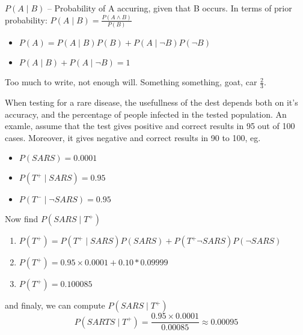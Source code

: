         {
            $P(A\mid B)$ -- Probability of A accuring, given that B occurs. In terms of prior probability:
            $P(A\mid B) = \frac{P(A \wedge B)}{P(B)}$
        }

        {
            \begin{itemize}
                    \item $P(A) = P(A\mid B)P(B) + P(A \mid \neg B)P( \neg B)$
                    \item $P(A \mid B) + P(A \mid \neg B) = 1$
                    
            \end{itemize}
        }

        {
            Too much to write, not enough will. Something something, goat, car $ \frac{2}{3} $.
        }

        {
            When testing for a rare disease, the usefullness of the dest depends both on it's accuracy, and the percentage of people infected in the tested population. An examle, assume that the test gives positive and correct results in 95 out of 100 cases. Moreover, it gives negative and correct results in 90 to 100, eg.
            \begin{itemize}
                    \item $P(SARS) = 0.0001$
                    \item $P( T^{+} \mid SARS) = 0.95$
                    \item $P(T ^{-} \mid \neg SARS) = 0.95$
            \end{itemize}
            Now find $P(SARS \mid T^{+})$

            \begin{enumerate}
            \item $P(T^{+}) = P(T^{+} \mid SARS)P(SARS) + P(T^{+} \neg SARS)P(\neg SARS)$
            \item $P(T^{+}) = 0.95 \times 0.0001 + 0.10 * 0.09999$
            \item  $P(T^+) = 0.100085$
            \end{enumerate}
            and finaly, we can compute $P(SARS \mid T^+)$
             \begin{equation}
                P(SARTS \mid T^+) = \frac{0.95 \times 0.0001}{0.00085} \approx 0.00095
            \end{equation}

        }


